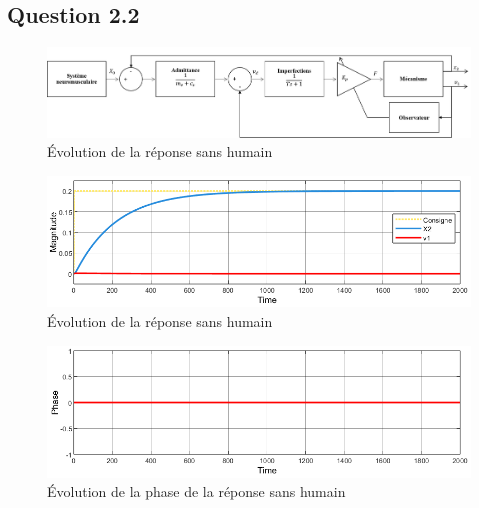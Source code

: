 \documentclass[a4paper,12pt]{article}
\begin{document}
    
    \subsection{Question 2.2}
    \begin{figure}[H]
        \centering
        \includegraphics[width=16cm]{./img/SchemaBlocNoHum.png}
        \caption{Évolution de la réponse sans humain\label{fig:SchemBlocNoHum}}
    \end{figure}
    \begin{figure}[H]
        \centering
        \includegraphics[width=16cm]{./img/response_NoHum_Gain.png}
        \caption{Évolution de la réponse sans humain\label{fig:RespNoHumGain}}
    \end{figure}
    \begin{figure}[H]
        \centering
        \includegraphics[width=16cm]{./img/response_NoHum_Phase.png}
        \caption{Évolution de la phase de la réponse sans humain\label{fig:RespNoHumPhase}}
    \end{figure}

    
\end{document}
